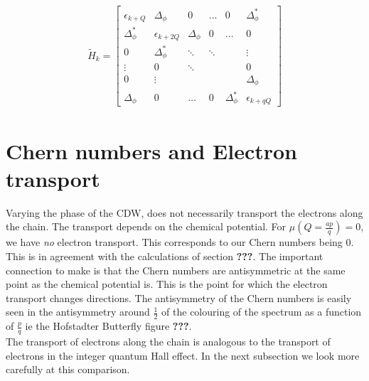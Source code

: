 \documentclass[letterpaper, 10 pt, conference]{ieeeconf}  %
\begin{document}
\begin{align}
\tilde{H}_{k}=\begin{bmatrix}
\epsilon_{k+Q}       & \Delta_\phi     & 0      & \hdots     & 0     & \Delta_\phi^*  \\
\Delta_\phi^*    & \epsilon_{k+2Q} & \Delta_\phi & 0 & \hdots     & 0 \\
0               & \Delta_\phi^* & \ddots & \ddots  &  &\vdots \\
\vdots   & 0 & \ddots &  &  &  0  \\
0 &  \vdots    &  &  &  & \Delta_{\phi} \\
\Delta_\phi & 0 &    \hdots          &0   & \Delta_{\phi}^{*}      & \epsilon_{k+qQ}
\end{bmatrix}
\end{align}




\section{Chern numbers and Electron transport}

Varying the phase of the CDW, does not necessarily transport the electrons along the chain.
The transport depends on the chemical potential.
For $\mu(Q=\frac{ap}{q}) = 0$, we have \textit{no} electron transport.
This corresponds to our Chern numbers being $0$.
This is in agreement with the calculations of section \textbf{???}.
The important connection to make is that the Chern numbers are antisymmetric at the same point as the chemical potential is.
This is the point for which the electron transport changes directions.
The antisymmetry of the Chern numbers is easily seen in the antisymmetry around $\frac{1}{2}$ of the colouring of the spectrum as a function of $\frac{p}{q}$ ie the Hofstadter Butterfly figure \textbf{???}.\\
The transport of electrons along the chain is analogous to the transport of electrons in the integer quantum Hall effect.
In the next subsection we look more carefully at this comparison.
\end{document}
